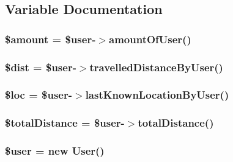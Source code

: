\subsection{Variable Documentation}
\hypertarget{test_8php_af48fe050f529b6ca56356299183b7778}{
\subsubsection[{\$amount}]{\setlength{\rightskip}{0pt plus 5cm}\$amount = \$user-\/$>$amount\-Of\-User()}}\label{test_8php_af48fe050f529b6ca56356299183b7778}
\hypertarget{test_8php_a2c65ce87b20f770bf48c5f6c585ec4a5}{
\subsubsection[{\$dist}]{\setlength{\rightskip}{0pt plus 5cm}\$dist = \$user-\/$>$travelled\-Distance\-By\-User()}}\label{test_8php_a2c65ce87b20f770bf48c5f6c585ec4a5}
\hypertarget{test_8php_a5b64ac9a38b866d891fcb47ca45c0b3d}{
\subsubsection[{\$loc}]{\setlength{\rightskip}{0pt plus 5cm}\$loc = \$user-\/$>$last\-Known\-Location\-By\-User()}}\label{test_8php_a5b64ac9a38b866d891fcb47ca45c0b3d}
\hypertarget{test_8php_aecf4f5c7feb86dbfd706f9eac2f9741a}{
\subsubsection[{\$total\-Distance}]{\setlength{\rightskip}{0pt plus 5cm}\$total\-Distance = \$user-\/$>$total\-Distance()}}\label{test_8php_aecf4f5c7feb86dbfd706f9eac2f9741a}
\hypertarget{test_8php_a598ca4e71b15a1313ec95f0df1027ca5}{
\subsubsection[{\$user}]{\setlength{\rightskip}{0pt plus 5cm}\$user = new {\bf User}()}}\label{test_8php_a598ca4e71b15a1313ec95f0df1027ca5}
